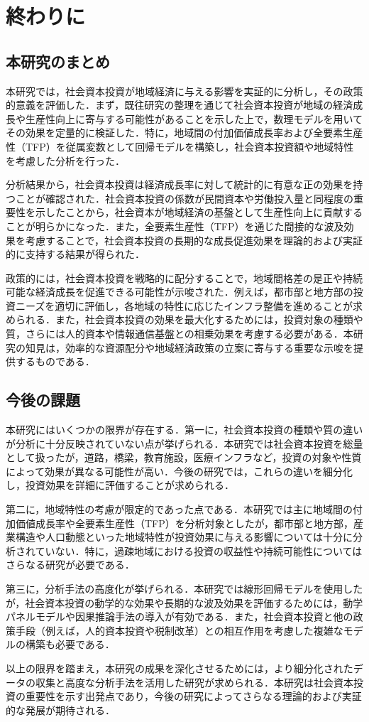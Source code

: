 \chapter{終わりに}

\section{本研究のまとめ}

本研究では，社会資本投資が地域経済に与える影響を実証的に分析し，その政策的意義を評価した．まず，既往研究の整理を通じて社会資本投資が地域の経済成長や生産性向上に寄与する可能性があることを示した上で，数理モデルを用いてその効果を定量的に検証した．特に，地域間の付加価値成長率および全要素生産性（TFP）を従属変数として回帰モデルを構築し，社会資本投資額や地域特性を考慮した分析を行った．

分析結果から，社会資本投資は経済成長率に対して統計的に有意な正の効果を持つことが確認された．社会資本投資の係数が民間資本や労働投入量と同程度の重要性を示したことから，社会資本が地域経済の基盤として生産性向上に貢献することが明らかになった．また，全要素生産性（TFP）を通じた間接的な波及効果を考慮することで，社会資本投資の長期的な成長促進効果を理論的および実証的に支持する結果が得られた．

政策的には，社会資本投資を戦略的に配分することで，地域間格差の是正や持続可能な経済成長を促進できる可能性が示唆された．例えば，都市部と地方部の投資ニーズを適切に評価し，各地域の特性に応じたインフラ整備を進めることが求められる．また，社会資本投資の効果を最大化するためには，投資対象の種類や質，さらには人的資本や情報通信基盤との相乗効果を考慮する必要がある．本研究の知見は，効率的な資源配分や地域経済政策の立案に寄与する重要な示唆を提供するものである．

\section{今後の課題}

本研究にはいくつかの限界が存在する．第一に，社会資本投資の種類や質の違いが分析に十分反映されていない点が挙げられる．本研究では社会資本投資を総量として扱ったが，道路，橋梁，教育施設，医療インフラなど，投資の対象や性質によって効果が異なる可能性が高い．今後の研究では，これらの違いを細分化し，投資効果を詳細に評価することが求められる．

第二に，地域特性の考慮が限定的であった点である．本研究では主に地域間の付加価値成長率や全要素生産性（TFP）を分析対象としたが，都市部と地方部，産業構造や人口動態といった地域特性が投資効果に与える影響については十分に分析されていない．特に，過疎地域における投資の収益性や持続可能性についてはさらなる研究が必要である．

第三に，分析手法の高度化が挙げられる．本研究では線形回帰モデルを使用したが，社会資本投資の動学的な効果や長期的な波及効果を評価するためには，動学パネルモデルや因果推論手法の導入が有効である．また，社会資本投資と他の政策手段（例えば，人的資本投資や税制改革）との相互作用を考慮した複雑なモデルの構築も必要である．

以上の限界を踏まえ，本研究の成果を深化させるためには，より細分化されたデータの収集と高度な分析手法を活用した研究が求められる．本研究は社会資本投資の重要性を示す出発点であり，今後の研究によってさらなる理論的および実証的な発展が期待される．


